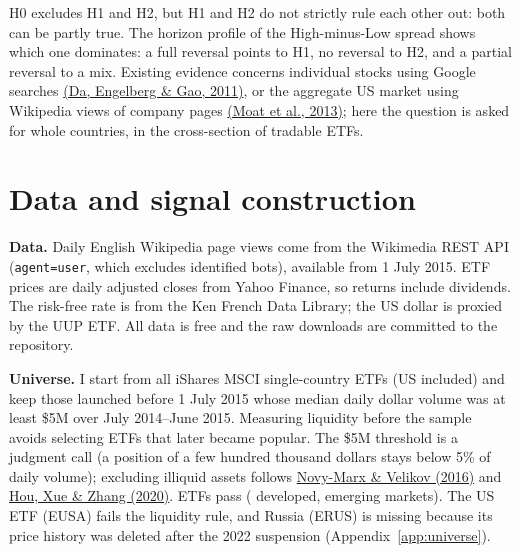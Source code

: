 \documentclass[11pt,a4paper]{article}
\DeclareRobustCommand{\refto}[2]{\hyperlink{ref:#1}{#2}}
\begin{document}
H0 excludes H1 and H2, but H1 and H2 do not strictly rule each other out: both can be partly true.
The horizon profile of the High-minus-Low spread shows which one dominates: a full reversal points
to H1, no reversal to H2, and a partial reversal to a mix. Existing evidence concerns individual
stocks using Google searches \refto{da2011}{(Da, Engelberg \& Gao, 2011)}, or the aggregate US market using
Wikipedia views of company pages \refto{moat2013}{(Moat et al., 2013)}; here the question is asked for whole
countries, in the cross-section of tradable ETFs.

\section{Data and signal construction}

\textbf{Data.} Daily English Wikipedia page views come from the Wikimedia REST API
(\texttt{agent=user}, which excludes identified bots), available from 1 July 2015.
ETF prices are daily adjusted closes from Yahoo Finance, so returns include dividends.
The risk-free rate is from the Ken French Data Library; the US dollar is proxied by the UUP ETF.
All data is free and the raw downloads are committed to the repository.

\textbf{Universe.} I start from all \NCandidates{} iShares MSCI single-country ETFs (US
included) and keep those launched before 1 July 2015 whose median daily dollar volume was at
least \$5M over July 2014--June 2015. Measuring liquidity before the sample avoids
selecting ETFs that later became popular. The \$5M threshold is a judgment call (a position of a few
hundred thousand dollars stays below 5\% of daily volume); excluding illiquid assets follows \refto{novymarx2016}{Novy-Marx \& Velikov (2016)} and
\refto{hou2020}{Hou, Xue \& Zhang (2020)}. \NEtfs{} ETFs pass (\NDeveloped{} developed,
\NEmerging{} emerging markets). The US ETF (EUSA) fails the liquidity rule, and Russia (ERUS)
is missing because its price history was deleted after the 2022 suspension
(Appendix~\ref{app:universe}).
\end{document}
